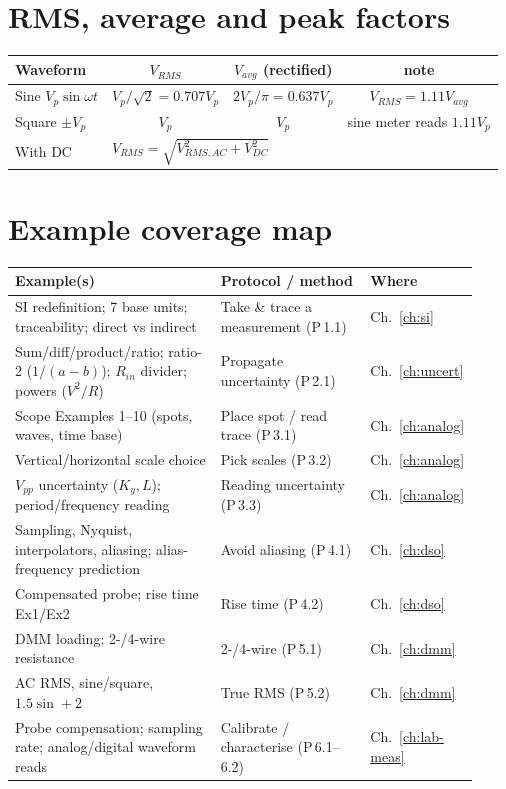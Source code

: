 \documentclass[11pt,a4paper,oneside]{book}
\begin{document}
\chapter{RMS, average and peak factors}\label{app:rms}
\begin{center}\small
\begin{tabular}{@{}lccc@{}}
\toprule
Waveform & $V_{RMS}$ & $V_{avg}$ (rectified) & note\\
\midrule
Sine $V_p\sin\omega t$ & $V_p/\sqrt2=0.707V_p$ & $2V_p/\pi=0.637V_p$ & $V_{RMS}=1.11V_{avg}$\\
Square $\pm V_p$ & $V_p$ & $V_p$ & sine meter reads $1.11V_p$\\
With DC & \multicolumn{3}{l}{$V_{RMS}=\sqrt{V_{RMS,AC}^2+V_{DC}^2}$}\\
\bottomrule
\end{tabular}
\end{center}

\chapter{Example coverage map}\label{app:coverage}
\begin{longtable}{@{}p{0.44\linewidth}p{0.32\linewidth}p{0.16\linewidth}@{}}
\toprule
\textbf{Example(s)} & \textbf{Protocol / method} & \textbf{Where}\\
\midrule\endhead
SI redefinition; 7 base units; traceability; direct vs indirect & Take \& trace a measurement (P\,1.1) & Ch.~\ref{ch:si}\\
Sum/diff/product/ratio; ratio-2 ($1/(a-b)$); $R_{in}$ divider; powers ($V^2/R$) & Propagate uncertainty (P\,2.1) & Ch.~\ref{ch:uncert}\\
Scope Examples 1--10 (spots, waves, time base) & Place spot / read trace (P\,3.1) & Ch.~\ref{ch:analog}\\
Vertical/horizontal scale choice & Pick scales (P\,3.2) & Ch.~\ref{ch:analog}\\
$V_{pp}$ uncertainty ($K_y,L$); period/frequency reading & Reading uncertainty (P\,3.3) & Ch.~\ref{ch:analog}\\
Sampling, Nyquist, interpolators, aliasing; alias-frequency prediction & Avoid aliasing (P\,4.1) & Ch.~\ref{ch:dso}\\
Compensated probe; rise time Ex1/Ex2 & Rise time (P\,4.2) & Ch.~\ref{ch:dso}\\
DMM loading; 2-/4-wire resistance & 2-/4-wire (P\,5.1) & Ch.~\ref{ch:dmm}\\
AC RMS, sine/square, $1.5\sin+2$ & True RMS (P\,5.2) & Ch.~\ref{ch:dmm}\\
Probe compensation; sampling rate; analog/digital waveform reads & Calibrate / characterise (P\,6.1--6.2) & Ch.~\ref{ch:lab-meas}\\
\bottomrule
\end{longtable}
\end{document}
